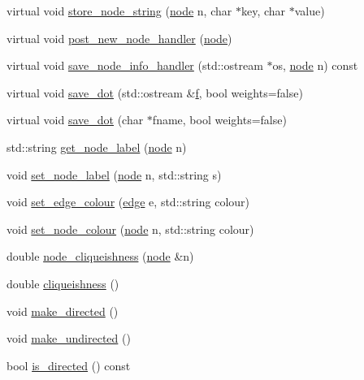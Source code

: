 \begin{DoxyCompactItemize}
\item 
virtual void \mbox{\hyperlink{class_my_graph_a1ca3d219454d57b8fc5ce67eaaf33013}{store\+\_\+node\+\_\+string}} (\mbox{\hyperlink{classnode}{node}} n, char $\ast$key, char $\ast$value)
\item 
virtual void \mbox{\hyperlink{class_my_graph_a21153d685303a6d2cfeee913aeb81223}{post\+\_\+new\+\_\+node\+\_\+handler}} (\mbox{\hyperlink{classnode}{node}})
\item 
virtual void \mbox{\hyperlink{class_my_graph_ad5f4b3ce70135723fe08a301d20c4a8a}{save\+\_\+node\+\_\+info\+\_\+handler}} (std\+::ostream $\ast$os, \mbox{\hyperlink{classnode}{node}} n) const
\item 
virtual void \mbox{\hyperlink{class_my_graph_acf68ca166eebb43a80b722c6ef15d22c}{save\+\_\+dot}} (std\+::ostream \&\mbox{\hyperlink{rings_8cpp_a77369fc4d5326a16d2c603e032023528}{f}}, bool weights=false)
\item 
virtual void \mbox{\hyperlink{class_my_graph_a646cfd85f487b7f7b8fd9f074bd595ca}{save\+\_\+dot}} (char $\ast$fname, bool weights=false)
\item 
std\+::string \mbox{\hyperlink{class_my_graph_ab92ebd7632157e681a6a7d7873841de7}{get\+\_\+node\+\_\+label}} (\mbox{\hyperlink{classnode}{node}} n)
\item 
void \mbox{\hyperlink{class_my_graph_ac70ce0dc28c8589443e45ef89acd00ca}{set\+\_\+node\+\_\+label}} (\mbox{\hyperlink{classnode}{node}} n, std\+::string s)
\item 
void \mbox{\hyperlink{class_my_graph_a865b0e9fd7f74cd40f23230733746a93}{set\+\_\+edge\+\_\+colour}} (\mbox{\hyperlink{classedge}{edge}} e, std\+::string colour)
\item 
void \mbox{\hyperlink{class_my_graph_a4cada42859b2a657637e81eef7c6e4ab}{set\+\_\+node\+\_\+colour}} (\mbox{\hyperlink{classnode}{node}} n, std\+::string colour)
\item 
double \mbox{\hyperlink{class_my_graph_a513bec2f1949a01d517dd57cc9c30233}{node\+\_\+cliqueishness}} (\mbox{\hyperlink{classnode}{node}} \&n)
\item 
double \mbox{\hyperlink{class_my_graph_a2bb131d5401dc66c01acb976daa7e981}{cliqueishness}} ()
\item 
void \mbox{\hyperlink{classgraph_a1615678dee6248d6d8a00c553770b3bd}{make\+\_\+directed}} ()
\item 
void \mbox{\hyperlink{classgraph_a31c8b895bd842f1b9dcc67649956cfc7}{make\+\_\+undirected}} ()
\item 
bool \mbox{\hyperlink{classgraph_afc510be7479fa903fde9e0e615470ab0}{is\+\_\+directed}} () const

\end{DoxyCompactItemize}
